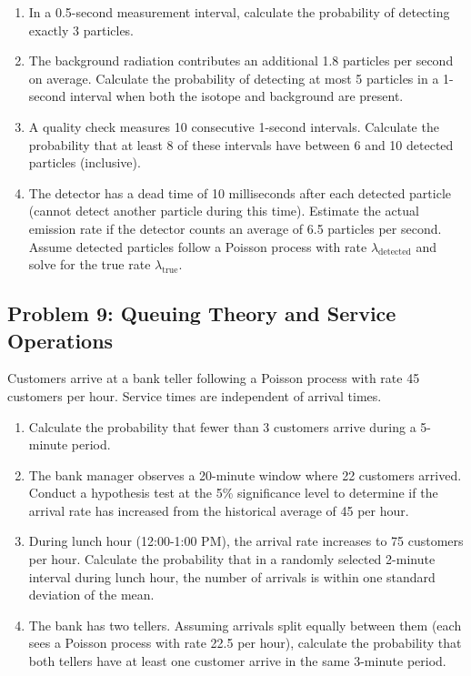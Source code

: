 \documentclass[12pt]{article}
\begin{document}
\begin{enumerate}[label=(\alph*)]
\item In a 0.5-second measurement interval, calculate the probability of detecting exactly 3 particles.

\item The background radiation contributes an additional 1.8 particles per second on average. Calculate the probability of detecting at most 5 particles in a 1-second interval when both the isotope and background are present.

\item A quality check measures 10 consecutive 1-second intervals. Calculate the probability that at least 8 of these intervals have between 6 and 10 detected particles (inclusive).

\item The detector has a dead time of 10 milliseconds after each detected particle (cannot detect another particle during this time). Estimate the actual emission rate if the detector counts an average of 6.5 particles per second. Assume detected particles follow a Poisson process with rate \(\lambda_{\text{detected}}\) and solve for the true rate \(\lambda_{\text{true}}\).
\end{enumerate}

\subsection*{Problem 9: Queuing Theory and Service Operations}

Customers arrive at a bank teller following a Poisson process with rate 45 customers per hour. Service times are independent of arrival times.

\begin{enumerate}[label=(\alph*)]
\item Calculate the probability that fewer than 3 customers arrive during a 5-minute period.

\item The bank manager observes a 20-minute window where 22 customers arrived. Conduct a hypothesis test at the 5\% significance level to determine if the arrival rate has increased from the historical average of 45 per hour.

\item During lunch hour (12:00-1:00 PM), the arrival rate increases to 75 customers per hour. Calculate the probability that in a randomly selected 2-minute interval during lunch hour, the number of arrivals is within one standard deviation of the mean.

\item The bank has two tellers. Assuming arrivals split equally between them (each sees a Poisson process with rate 22.5 per hour), calculate the probability that both tellers have at least one customer arrive in the same 3-minute period.
\end{enumerate}
\end{document}
